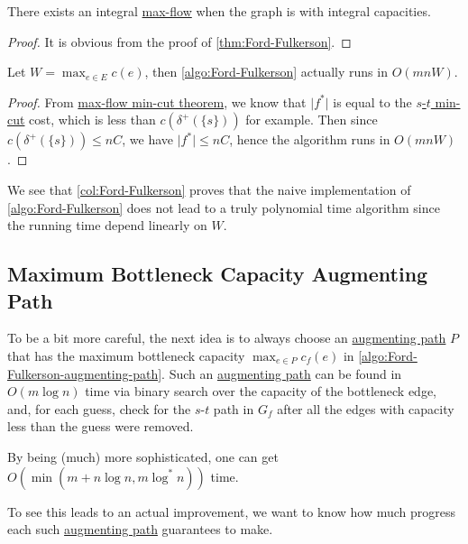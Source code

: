 \begin{corollary}
	There exists an integral \hyperref[prb:s-t-max-flow]{max-flow} when the graph is with integral capacities.
\end{corollary}
\begin{proof}
	It is obvious from the proof of \autoref{thm:Ford-Fulkerson}.
\end{proof}

\begin{corollary}\label{col:Ford-Fulkerson}
	Let \(W = \max _{e \in E} c(e)\), then \autoref{algo:Ford-Fulkerson} actually runs in \(O(mn W)\).
\end{corollary}
\begin{proof}
	From \hyperref[thm:max-flow-min-cut]{max-flow min-cut theorem}, we know that \(\lvert f^{\ast} \rvert \) is equal to the \hyperref[prb:s-t-min-cut]{\(s\)-\(t\) min-cut} cost, which is less than \(c(\delta ^+(\{ s \} ))\) for example. Then since \(c(\delta ^+(\{ s \} )) \leq n C\), we have \(\lvert f^{\ast} \rvert \leq nC\), hence the algorithm runs in \(O(mn W)\).
\end{proof}

We see that \autoref{col:Ford-Fulkerson} proves that the naive implementation of \autoref{algo:Ford-Fulkerson} does not lead to a truly polynomial time algorithm since the running time depend linearly on \(W\).

\subsection{Maximum Bottleneck Capacity Augmenting Path}
To be a bit more careful, the next idea is to always choose an \hyperref[def:augmenting-path]{augmenting path} \(P\) that has the maximum bottleneck capacity \(\max _{e \in P} c_f(e)\) in \autoref{algo:Ford-Fulkerson-augmenting-path}. Such an \hyperref[def:augmenting-path]{augmenting path} can be found in \(O(m \log n)\) time via binary search over the capacity of the bottleneck edge, and, for each guess, check for the \(s\)-\(t\) path in \(G_f\) after all the edges with capacity less than the guess were removed.

\begin{note}
	By being (much) more sophisticated, one can get \(O(\min (m + n \log n, m \log ^{\ast} n))\) time.
\end{note}

To see this leads to an actual improvement, we want to know how much progress each such \hyperref[def:augmenting-path]{augmenting path} guarantees to make.

